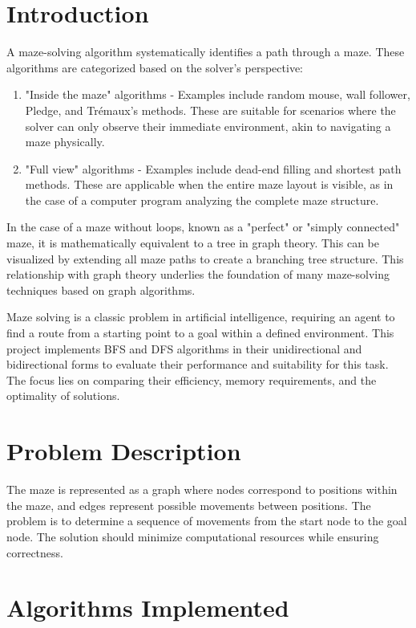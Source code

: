 \documentclass[final, journal, 11pt]{report}
\begin{document}
	\section*{Introduction}
	
	A maze-solving algorithm systematically identifies a path through a maze. These algorithms are categorized based on the solver's perspective:
	
	\begin{enumerate}
	\item "Inside the maze" algorithms - Examples include random mouse, wall follower, Pledge, and Trémaux's methods. These are suitable for scenarios where the solver can only observe their immediate environment, akin to navigating a maze physically.

	\item "Full view" algorithms - Examples include dead-end filling and shortest path methods. These are applicable when the entire maze layout is visible, as in the case of a computer program analyzing the complete maze structure.
	\end{enumerate}

	
	In the case of a maze without loops, known as a "perfect" or "simply connected" maze, it is mathematically equivalent to a tree in graph theory. This can be visualized by extending all maze paths to create a branching tree structure. This relationship with graph theory underlies the foundation of many maze-solving techniques based on graph algorithms.
	
	Maze solving is a classic problem in artificial intelligence, requiring an agent to find a route from a starting point to a goal within a defined environment. This project implements BFS and DFS algorithms in their unidirectional and bidirectional forms to evaluate their performance and suitability for this task. The focus lies on comparing their efficiency, memory requirements, and the optimality of solutions.
	
	
	\section*{Problem Description}
	The maze is represented as a graph where nodes correspond to positions within the maze, and edges represent possible movements between positions. The problem is to determine a sequence of movements from the start node to the goal node. The solution should minimize computational resources while ensuring correctness.
	
	\section*{Algorithms Implemented}
	
\end{document}
